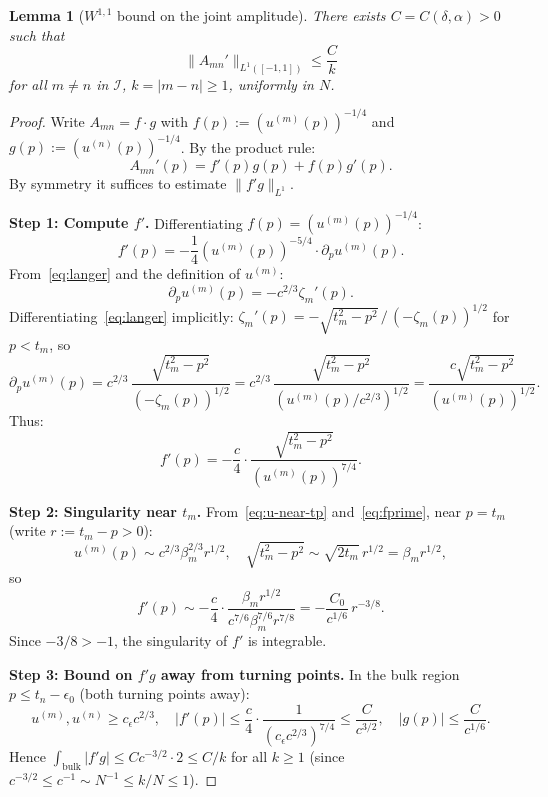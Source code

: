 \documentclass[12pt,a4paper]{amsart}
\newtheorem{lemma}[theorem]{Lemma}
\theoremstyle{definition}
\newcommand{\norm}[1]{\|#1\|}
\begin{document}
\begin{lemma}[$W^{1,1}$ bound on the joint amplitude]\label{lem:W11}
There exists $C = C(\delta, \alpha) > 0$ such that
\[
  \norm{A_{mn}'}_{L^1([-1,1])} \leq \frac{C}{k}
\]
for all $m \neq n$ in $\mathcal{I}$, $k = |m-n| \geq 1$, uniformly in $N$.
\end{lemma}

\begin{proof}
Write $A_{mn} = f \cdot g$ with
$f(p) := (u^{(m)}(p))^{-1/4}$ and $g(p) := (u^{(n)}(p))^{-1/4}$.
By the product rule:
\[
  A_{mn}'(p) = f'(p)g(p) + f(p)g'(p).
\]
By symmetry it suffices to estimate $\norm{f' g}_{L^1}$.

\medskip
\noindent\textbf{Step 1: Compute $f'$.}
Differentiating $f(p) = (u^{(m)}(p))^{-1/4}$:
\[
  f'(p) = -\frac{1}{4}(u^{(m)}(p))^{-5/4}\cdot \partial_p u^{(m)}(p).
\]
From~\eqref{eq:langer} and the definition of $u^{(m)}$:
\begin{equation}\label{eq:du-dp}
  \partial_p u^{(m)}(p) = -c^{2/3}\zeta_m'(p).
\end{equation}
Differentiating~\eqref{eq:langer} implicitly:
$\zeta_m'(p) = -\sqrt{t_m^2 - p^2}\,/\,(-\zeta_m(p))^{1/2}$
for $p < t_m$, so
\[
  \partial_p u^{(m)}(p) = c^{2/3}\,\frac{\sqrt{t_m^2 - p^2}}{(-\zeta_m(p))^{1/2}}
  = c^{2/3}\,\frac{\sqrt{t_m^2 - p^2}}{(u^{(m)}(p)/c^{2/3})^{1/2}}
  = \frac{c \sqrt{t_m^2 - p^2}}{(u^{(m)}(p))^{1/2}}.
\]
Thus:
\begin{equation}\label{eq:fprime}
  f'(p) = -\frac{c}{4}\cdot\frac{\sqrt{t_m^2 - p^2}}{(u^{(m)}(p))^{7/4}}.
\end{equation}

\medskip
\noindent\textbf{Step 2: Singularity near $t_m$.}
From~\eqref{eq:u-near-tp} and~\eqref{eq:fprime},
near $p = t_m$ (write $r := t_m - p > 0$):
\[
  u^{(m)}(p) \sim c^{2/3}\beta_m^{2/3} r^{1/2},
  \quad
  \sqrt{t_m^2 - p^2} \sim \sqrt{2t_m}\, r^{1/2} = \beta_m r^{1/2},
\]
so
\[
  f'(p) \sim -\frac{c}{4}\cdot
  \frac{\beta_m r^{1/2}}{c^{7/6}\beta_m^{7/6} r^{7/8}}
  = -\frac{C_0}{c^{1/6}}\, r^{-3/8}.
\]
Since $-3/8 > -1$, the singularity of $f'$ is integrable.

\medskip
\noindent\textbf{Step 3: Bound on $f' g$ away from turning points.}
In the bulk region $p \leq t_n - \epsilon_0$ (both turning points away):
\[
  u^{(m)}, u^{(n)} \geq c_\epsilon c^{2/3},
  \quad
  |f'(p)| \leq \frac{c}{4}\cdot\frac{1}{(c_\epsilon c^{2/3})^{7/4}}
  \leq \frac{C}{c^{3/2}},
  \quad
  |g(p)| \leq \frac{C}{c^{1/6}}.
\]
Hence $\int_{\text{bulk}} |f'g| \leq C c^{-3/2}\cdot 2 \leq C/k$ for all $k \geq 1$
(since $c^{-3/2} \leq c^{-1} \sim N^{-1} \leq k/N \leq 1$).


\end{proof}
\end{document}
